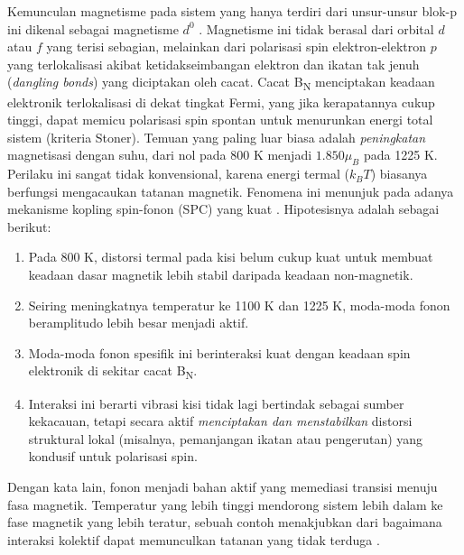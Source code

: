 Kemunculan magnetisme pada sistem yang hanya terdiri dari unsur-unsur blok-p ini dikenal sebagai magnetisme $d^0$ \citep{zhou2019}.
Magnetisme ini tidak berasal dari orbital $d$ atau $f$ yang terisi sebagian, melainkan dari polarisasi spin elektron-elektron $p$ yang terlokalisasi akibat ketidakseimbangan elektron dan ikatan tak jenuh (\emph{dangling bonds}) yang diciptakan oleh cacat.
Cacat B\textsubscript{N} menciptakan keadaan elektronik terlokalisasi di dekat tingkat Fermi, yang jika kerapatannya cukup tinggi, dapat memicu polarisasi spin spontan untuk menurunkan energi total sistem (kriteria Stoner).
Temuan yang paling luar biasa adalah \emph{peningkatan} magnetisasi dengan suhu, dari nol pada 800 K menjadi $1.850 \mu_B$ pada 1225 K. Perilaku ini sangat tidak konvensional, karena energi termal ($k_B T$) biasanya berfungsi mengacaukan tatanan magnetik.
Fenomena ini menunjuk pada adanya mekanisme kopling spin-fonon (SPC) yang kuat \citep{Liu_2025}.
Hipotesisnya adalah sebagai berikut:
\begin{enumerate}
    \item Pada 800 K, distorsi termal pada kisi belum cukup kuat untuk membuat keadaan dasar magnetik lebih stabil daripada keadaan non-magnetik.
\item Seiring meningkatnya temperatur ke 1100 K dan 1225 K, moda-moda fonon beramplitudo lebih besar menjadi aktif.
\item Moda-moda fonon spesifik ini berinteraksi kuat dengan keadaan spin elektronik di sekitar cacat B\textsubscript{N}.
\item Interaksi ini berarti vibrasi kisi tidak lagi bertindak sebagai sumber kekacauan, tetapi secara aktif \emph{menciptakan dan menstabilkan} distorsi struktural lokal (misalnya, pemanjangan ikatan atau pengerutan) yang kondusif untuk polarisasi spin.
\end{enumerate}
Dengan kata lain, fonon menjadi bahan aktif yang memediasi transisi menuju fasa magnetik.
Temperatur yang lebih tinggi mendorong sistem lebih dalam ke fase magnetik yang lebih teratur, sebuah contoh menakjubkan dari bagaimana interaksi kolektif dapat memunculkan tatanan yang tidak terduga \citep{Pantazopoulos2024}.

